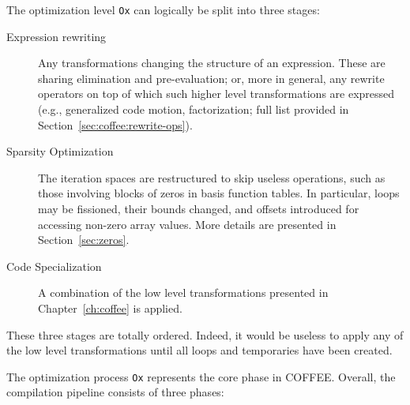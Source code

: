 The optimization level \texttt{Ox} can logically be split into three stages:
\begin{description}
\item[Expression rewriting] Any transformations changing the structure of an expression. These are sharing elimination and pre-evaluation; or, more in general, any rewrite operators on top of which such higher level transformations are expressed (e.g., generalized code motion, factorization; full list provided in Section~\ref{sec:coffee:rewrite-ops}). 
\item[Sparsity Optimization] The iteration spaces are restructured to skip useless operations, such as those involving blocks of zeros in basis function tables. In particular, loops may be fissioned, their bounds changed, and offsets introduced for accessing non-zero array values. More details are presented in Section~\ref{sec:zeros}.
\item[Code Specialization] A combination of the low level transformations presented in Chapter~\ref{ch:coffee} is applied.
\end{description}
These three stages are totally ordered. Indeed, it would be useless to apply any of the low level transformations until all loops and temporaries have been created.

The optimization process \texttt{Ox} represents the core phase in COFFEE. Overall, the compilation pipeline consists of three phases:

